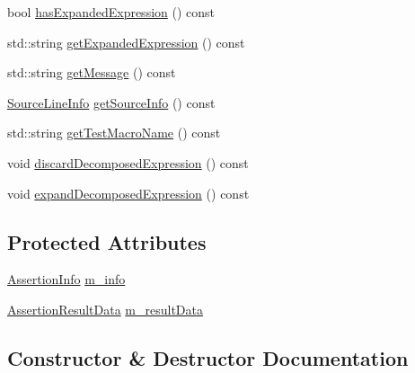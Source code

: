 \begin{DoxyCompactItemize}
\item 
bool \mbox{\hyperlink{class_catch_1_1_assertion_result_a78c43506c2b3d8cc1fb141a97d09ec94}{has\+Expanded\+Expression}} () const
\item 
std\+::string \mbox{\hyperlink{class_catch_1_1_assertion_result_aaa46070791a6c07caaed86229b8d9d75}{get\+Expanded\+Expression}} () const
\item 
std\+::string \mbox{\hyperlink{class_catch_1_1_assertion_result_ae730943beed46921b09383c673e35786}{get\+Message}} () const
\item 
\mbox{\hyperlink{struct_catch_1_1_source_line_info}{Source\+Line\+Info}} \mbox{\hyperlink{class_catch_1_1_assertion_result_aa4d3fdbfe276a69a035762dbb790800f}{get\+Source\+Info}} () const
\item 
std\+::string \mbox{\hyperlink{class_catch_1_1_assertion_result_aaefd9a0384282fd08a4a72aa19bd0628}{get\+Test\+Macro\+Name}} () const
\item 
void \mbox{\hyperlink{class_catch_1_1_assertion_result_a406884d8b8209c80078706724c528df5}{discard\+Decomposed\+Expression}} () const
\item 
void \mbox{\hyperlink{class_catch_1_1_assertion_result_ac0b1d268a3ffa1f1fb305cad9435d824}{expand\+Decomposed\+Expression}} () const
\end{DoxyCompactItemize}
\subsection*{Protected Attributes}
\begin{DoxyCompactItemize}
\item 
\mbox{\hyperlink{struct_catch_1_1_assertion_info}{Assertion\+Info}} \mbox{\hyperlink{class_catch_1_1_assertion_result_a3e7236f73a51d6fc8bb9dfdefcee7772}{m\+\_\+info}}
\item 
\mbox{\hyperlink{struct_catch_1_1_assertion_result_data}{Assertion\+Result\+Data}} \mbox{\hyperlink{class_catch_1_1_assertion_result_add3455b8bbedb0d643e18da67c66b4f7}{m\+\_\+result\+Data}}
\end{DoxyCompactItemize}


\subsection{Constructor \& Destructor Documentation}
\mbox{\label{class_catch_1_1_assertion_result_a570b999c5f66e33cb31d3adb29fec25b}} 

